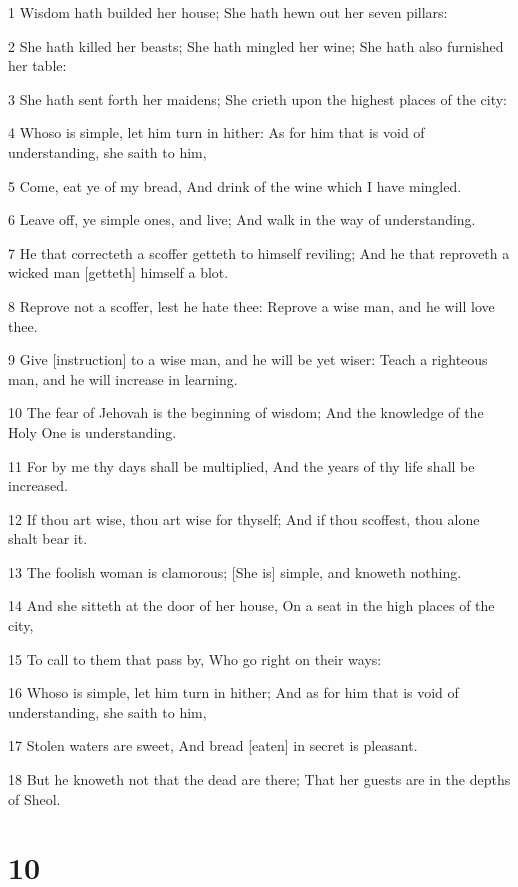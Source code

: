 \par 1 Wisdom hath builded her house; She hath hewn out her seven pillars:
\par 2 She hath killed her beasts; She hath mingled her wine; She hath also furnished her table:
\par 3 She hath sent forth her maidens; She crieth upon the highest places of the city:
\par 4 Whoso is simple, let him turn in hither: As for him that is void of understanding, she saith to him,
\par 5 Come, eat ye of my bread, And drink of the wine which I have mingled.
\par 6 Leave off, ye simple ones, and live; And walk in the way of understanding.
\par 7 He that correcteth a scoffer getteth to himself reviling; And he that reproveth a wicked man [getteth] himself a blot.
\par 8 Reprove not a scoffer, lest he hate thee: Reprove a wise man, and he will love thee.
\par 9 Give [instruction] to a wise man, and he will be yet wiser: Teach a righteous man, and he will increase in learning.
\par 10 The fear of Jehovah is the beginning of wisdom; And the knowledge of the Holy One is understanding.
\par 11 For by me thy days shall be multiplied, And the years of thy life shall be increased.
\par 12 If thou art wise, thou art wise for thyself; And if thou scoffest, thou alone shalt bear it.
\par 13 The foolish woman is clamorous; [She is] simple, and knoweth nothing.
\par 14 And she sitteth at the door of her house, On a seat in the high places of the city,
\par 15 To call to them that pass by, Who go right on their ways:
\par 16 Whoso is simple, let him turn in hither; And as for him that is void of understanding, she saith to him,
\par 17 Stolen waters are sweet, And bread [eaten] in secret is pleasant.
\par 18 But he knoweth not that the dead are there; That her guests are in the depths of Sheol.

\chapter{10}

